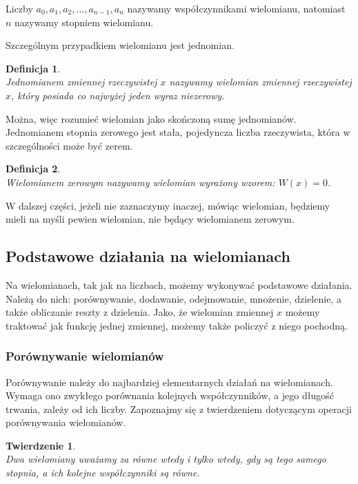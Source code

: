 \documentclass[oneside,a4paper]{book}
\newtheorem{theorem}{Twierdzenie}
\newtheorem{definition}{Definicja}
\begin{document}
	Liczby $a_0, a_1, a_2, ..., a_{n-1}, a_n$ nazywamy współczynnikami wielomianu, natomiast $n$ nazywamy stopniem wielomianu.
	
	Szczególnym przypadkiem wielomianu jest jednomian. 
	
	\begin{definition}
		$ $\\
		Jednomianem zmiennej rzeczywistej $x$ nazywamy wielomian zmiennej rzeczywistej $x$, który posiada co najwyżej jeden wyraz niezerowy.
	\end{definition}
	
	Można, więc rozumieć wielomian jako skończoną sumę jednomianów.
	Jednomianem stopnia zerowego jest stała, pojedyncza liczba rzeczywista, która w szczególności może być zerem.
	
	\begin{definition}
		$ $\\
		Wielomianem zerowym nazywamy wielomian wyrażony wzorem:	$W(x) = 0$.
	\end{definition}
	
	W dalszej części, jeżeli nie zaznaczymy inaczej, mówiąc wielomian, będziemy mieli na myśli pewien wielomian, nie będący wielomianem zerowym.
	
	\subsection{Podstawowe działania na wielomianach}
	
	Na wielomianach, tak jak na liczbach, możemy wykonywać podstawowe działania. Należą do nich: porównywanie, dodawanie, odejmowanie, mnożenie, dzielenie, a także obliczanie reszty z dzielenia. Jako, że wielomian zmiennej $x$ możemy traktować jak funkcję jednej zmiennej, możemy także policzyć z niego pochodną.
	
	\subsubsection{Porównywanie wielomianów}
	Porównywanie należy do najbardziej elementarnych działań na wielomianach. Wymaga ono zwykłego porównania kolejnych współczynników, a jego długość trwania, zależy od ich liczby. Zapoznajmy się z twierdzeniem dotyczącym operacji porównywania wielomianów.
	
	\begin{theorem}
		$ $\\
		Dwa wielomiany uważamy za równe wtedy i tylko wtedy, gdy są tego samego stopnia, a ich kolejne współczynniki są równe.
	\end{theorem}
	
\end{document}
